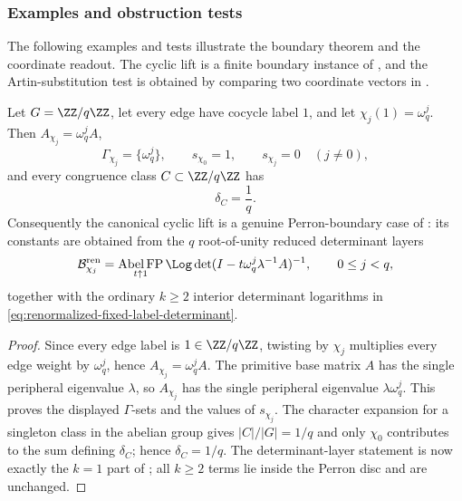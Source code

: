 \subsubsection{Examples and obstruction tests}
\label{subsubsec:perron-boundary-examples}

The following examples and tests illustrate the boundary theorem and the
coordinate readout.  The cyclic lift is a finite boundary instance of
, and the Artin-substitution
test is obtained by comparing two coordinate vectors in
.

\begin{remark}
  \label{cor:canonical-cyclic-lift-boundary}
  Let \(G=\ZZ/q\ZZ\), let every edge have cocycle label \(1\), and let
  \(\chi_j(1)=\omega_q^j\).  Then
  \(A_{\chi_j}=\omega_q^jA\),
  \[
    \Gamma_{\chi_j}=\{\omega_q^j\},\qquad
    s_{\chi_0}=1,\qquad s_{\chi_j}=0\quad(j\ne0),
  \]
  and every congruence class \(C\subset\ZZ/q\ZZ\) has
  \[
    \delta_C=\frac1q .
  \]
  Consequently the canonical cyclic lift is a genuine Perron-boundary case
  of : its constants are obtained
  from the \(q\) root-of-unity reduced determinant layers
  \[
    \mathcal B_{\chi_j}^{\mathrm{ren}}
    =
    \operatorname*{Abel\,FP}_{t\uparrow1}
      \Log\det(I-t\omega_q^j\lambda^{-1}A)^{-1},
    \qquad 0\le j<q,
  \]
  together with the ordinary \(k\ge2\) interior determinant logarithms in
  \eqref{eq:renormalized-fixed-label-determinant}.
\end{remark}

\begin{proof}
  Since every edge label is \(1\in\ZZ/q\ZZ\), twisting by \(\chi_j\)
  multiplies every edge weight by \(\omega_q^j\), hence
  \(A_{\chi_j}=\omega_q^jA\).  The primitive base matrix \(A\) has the
  single peripheral eigenvalue \(\lambda\), so \(A_{\chi_j}\) has the
  single peripheral eigenvalue \(\lambda\omega_q^j\).  This proves the
  displayed \(\Gamma\)-sets and the values of \(s_{\chi_j}\).  The
  character expansion for a singleton class in the abelian group gives
  \(|C|/|G|=1/q\) and only \(\chi_0\) contributes to the sum defining
  \(\delta_C\); hence \(\delta_C=1/q\).  The determinant-layer statement is
  now exactly the \(k=1\) part of
  ; all \(k\ge2\) terms lie
  inside the Perron disc and are unchanged.
\end{proof}

